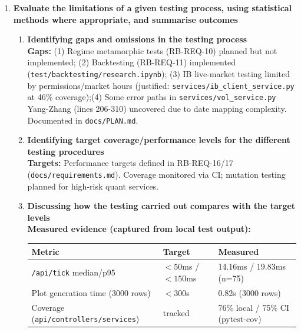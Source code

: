 \documentclass[11pt]{article}
\begin{document}
\begin{enumerate}
\begin{enumerate}
\item \textbf{Evaluation of the results}\\
\textbf{Evaluation:} Coverage treated as adequacy criterion (not proof). Low-coverage modules justified (external artifacts, optional integrations). Performance compared to RB-REQ-16/17 targets, regressions prevented via CI. Backtesting demonstrates sound methodology (train/test split, fees, no look-ahead bias). Test period (19.90\% return, Sharpe 2.97) validates out-of-sample reliability. Validates RB-REQ-11 (time-series split enforcement).
\end{enumerate}
\item \textbf{Evaluate the limitations of a given testing process, using statistical methods where appropriate, and summarise outcomes} \marginpar{[default 20\%]}
\begin{enumerate}
\item \textbf{Identifying gaps and omissions in the testing process}\\
\textbf{Gaps:} (1) Regime metamorphic tests (RB-REQ-10) planned but not implemented; (2) Backtesting (RB-REQ-11) implemented (\texttt{test/backtesting/research.ipynb}); (3) IB live-market testing limited by permissions/market hours (justified: \newline\texttt{services/ib\_client\_service.py} at 46\% coverage);\newline (4) Some error paths in \texttt{services/vol\_service.py} Yang-Zhang (lines 206-310) uncovered due to date mapping complexity. Documented in \texttt{docs/PLAN.md}.

\item \textbf{Identifying target coverage/performance levels for the different testing procedures}\\
\textbf{Targets:} Performance targets defined in RB-REQ-16/17 (\texttt{docs/requirements.md}). Coverage monitored via CI; mutation testing planned for high-risk quant services.

\item \textbf{Discussing how the testing carried out compares with the target levels}\\
\textbf{Measured evidence (captured from local test output):}
\begin{center}
\begin{tabular}{lll}
\textbf{Metric} & \textbf{Target} & \textbf{Measured} \\
\hline
\texttt{/api/tick} median/p95 & $<50$ms / $<150$ms & 14.16ms / 19.83ms (n=75) \\
Plot generation time (3000 rows) & $<300$s & 0.82s (3000 rows) \\
Coverage (\texttt{api/controllers/services}) & tracked & 76\% local / 75\% CI (pytest-cov) \\
\end{tabular}
\end{center}


\end{enumerate}
\end{enumerate}
\end{document}
